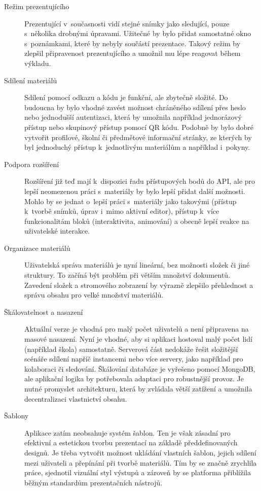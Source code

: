 \begin{description}
  \item[Režim prezentujícího] Prezentující v~současnosti vidí stejné snímky jako sledující, pouze s~několika drobnými úpravami. 
  Užitečné by bylo přidat samostatné okno s~poznámkami, které by nebyly součástí prezentace. 
  Takový režim by zlepšil připravenost prezentujícího a umožnil mu lépe reagovat během výkladu.

  \item[Sdílení materiálů] Sdílení pomocí odkazu a kódu je funkční, ale zbytečně složité. 
  Do budoucna by bylo vhodné zavést možnost chráněného sdílení přes heslo nebo jednodušší autentizaci, která by umožnila například jednorázový přístup nebo skupinový přístup pomocí QR kódu.
  Podobně by bylo dobré vytvořit profilové, školní či předmětové informační stránky, ze kterých by byl jednoduchý přístup k~jednotlivým materiálům a například i~pokyny.
  
  \item[Podpora rozšíření] Rozšíření již teď mají k~dispozici řadu přístupových bodů do API, ale pro lepší neomezenou práci s~materiály by bylo lepší přidat další možnosti.
  Mohlo by se jednat o~lepší práci s~materiály jako takovými (přístup k~tvorbě snímků, úprav i~mimo aktivní editor), přístup k~více funkcionalitám bloků (interaktivita, animování) a obecně lepší reakce na uživatelské interakce.

  \item[Organizace materiálů] Uživatelská správa materiálů je nyní lineární, bez možnosti složek či jiné struktury. 
  To začíná být problém při větším množství dokumentů. 
  Zavedení složek a stromového zobrazení by výrazně zlepšilo přehlednost a správu obsahu pro velké množství materiálů.

  \item[Škálovatelnost a nasazení] Aktuální verze je vhodná pro malý počet uživatelů a není připravena na masové nasazení. 
  Nyní je vhodné, aby si aplikaci hostoval malý počet lidí (například škola) samostatně.
  Serverová část nedokáže řešit složitější scénáře sdílení napříč instancemi nebo více servery, jako například pro kolaboraci či sledování.
  Škálování databáze je vyřešeno pomocí MongoDB, ale aplikační logika by potřebovala adaptaci pro robustnější provoz. 
  Je nutné promyslet architekturu, která by zvládala větší zatížení a umožnila decentralizaci vlastnictví obsahu.

  \item[Šablony] Aplikace zatím neobsahuje systém šablon. 
  Ten je však zásadní pro efektivní a estetickou tvorbu prezentací na základě předdefinovaných designů. 
  Je třeba vytvořit možnost ukládání vlastních šablon, jejich sdílení mezi uživateli a přepínání při tvorbě materiálů. 
  Tím by se značně zrychlila práce, sjednotil vizuální styl výstupů a zároveň by se platforma přiblížila běžným standardům prezentačních nástrojů.


\end{description}
